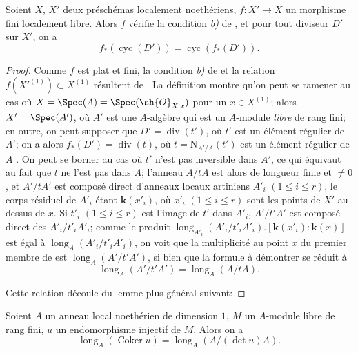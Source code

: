 \begin{proposition}[21.10.17]
\label{IV.21.10.17}
Soient $X$, $X'$ deux préschémas localement noethériens, $f:X'\to X$ un morphisme fini localement libre.
Alors $f$ vérifie la condition \emph{b)} de , et pour tout diviseur $D'$ sur $X'$, on a
\[
\label{IV.21.10.17.1}
  f_*(\operatorname{cyc}(D'))=\operatorname{cyc}(f_*(D')).
  \tag{21.10.17.1}
\]
\end{proposition}

\begin{proof}
Comme $f$ est plat et fini, la condition \emph{b)} de  et la relation $f(X'^{(1)})\subset X^{(1)}$ résultent de .
La définition  montre qu'on peut se ramener au cas où $X=\Spec(A)=\Spec(\sh{O}_{X,x})$ pour un $x\in X^{(1)}$;
alors $X'=\Spec(A')$, où $A'$ est une
$A$-algèbre qui est un $A$-module \emph{libre} de rang fini;
en outre, on peut supposer que $D'=\operatorname{div}(t')$, où $t'$ est un élément régulier de $A'$;
on a alors $f_*(D')=\operatorname{div}(t)$, où $t=\mathrm{N}_{A'/A}(t')$ est un élément régulier de $A$ .
On peut se borner au cas où $t'$ n'est pas inversible dans $A'$, ce qui équivaut au fait que $t$ ne l'est pas dans $A$;
l'anneau $A/tA$ est alors de longueur finie et $\neq0$, et $A'/tA'$ est composé direct d'anneaux locaux artiniens $A'_i$ $(1\leq i\leq r)$, le corps résiduel de $A'_i$ étant $\boldsymbol{k}(x'_i)$, où $x'_i$ $(1\leq i\leq r)$ sont les points de $X'$ au-dessus de $x$.
Si $t'_i$ $(1\leq i\leq r)$ est l'image de $t'$ dans $A'_i$, $A'/t'A'$ est composé direct des $A'_i/t'_iA'_i$;
comme le produit $\operatorname{long}_{A'_i}(A'_i/t'_iA'_i).[\boldsymbol{k}(x'_i):\boldsymbol{k}(x)]$ est égal à $\operatorname{long}_A(A'_i/t'_iA'_i)$, on voit que la multiplicité au point $x$ du premier membre de  est $\operatorname{long}_A(A'/t'A')$, si bien que la formule à démontrer se réduit à
\[
\label{IV.21.10.17.2}
  \operatorname{long}_A(A'/t'A')=\operatorname{long}_A(A/tA).
  \tag{21.10.17.2}
\]

Cette relation découle du lemme plus général suivant:
\end{proof}

\begin{lemma}[21.10.17.3]
\label{IV.21.10.17.3}
Soient $A$ un anneau local noethérien de dimension $1$, $M$ un $A$-module libre de rang fini, $u$ un endomorphisme injectif de $M$.
Alors on a
\[
\label{IV.21.10.17.4}
  \operatorname{long}_A(\operatorname{Coker}u)=\operatorname{long}_A(A/(\det u)A).
  \tag{21.10.17.4}
\]
\end{lemma}

